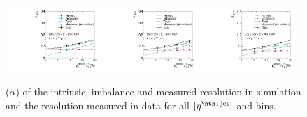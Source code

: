 \begin{figure}[ht]
    \includegraphics[width=0.32\textwidth]{figures/resolution/results/JER_for_1_eta_bin_9_pTGamma_bin_all_contributions_PFCHS_RMS99_mc.pdf}
    \includegraphics[width=0.32\textwidth]{figures/resolution/results/JER_for_1_eta_bin_10_pTGamma_bin_all_contributions_PFCHS_RMS99_mc.pdf}
    \includegraphics[width=0.32\textwidth]{figures/resolution/results/JER_for_1_eta_bin_11_pTGamma_bin_all_contributions_PFCHS_RMS99_mc.pdf}
  \caption{\jer($\alpha$) of the intrinsic, imbalance and measured resolution in simulation and the resolution measured in data for all $|\etafirstjet|$ and \ptgamma bins.}
  \label{fig:ExtrapolationPlots1}
\end{figure}

